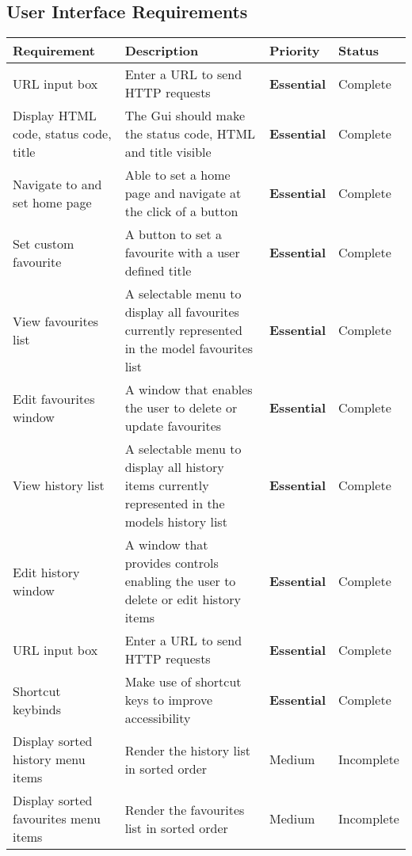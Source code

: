 \documentclass[../Main.tex]{subfiles}
\begin{document}
\subsection{User Interface Requirements}\label{subsec:UIRequirements}
\begin{center}
        \begin{longtable}{|p{3cm}|p{7cm}|l|p{2cm}|}
            \hline
            \textbf{Requirement} & \textbf{Description} & \textbf{Priority} & \textbf{Status}\\
            \hline \endhead
            URL input box & Enter a URL to send HTTP requests & \textbf{Essential} & Complete\\
            \hline
            Display HTML code, status code, title & The Gui should make the status code, HTML and title visible & \textbf{Essential} & Complete\\
            \hline
            Navigate to and set home page & Able to set a home page and navigate at the click of a button & \textbf{Essential} & Complete\\
            \hline
            Set custom favourite & A button to set a favourite with a user defined title & \textbf{Essential} & Complete\\
            \hline
            View favourites list & A selectable menu to display all favourites currently represented in the model favourites list & \textbf{Essential} & Complete\\
            \hline
            Edit favourites window & A window that enables the user to delete or update favourites & \textbf{Essential} & Complete\\
            \hline
            View history list & A selectable menu to display all history items currently represented in the models history list & \textbf{Essential} & Complete\\
            \hline
            Edit history window & A window that provides controls enabling the user to delete or edit history items & \textbf{Essential} & Complete\\
            \hline
            URL input box & Enter a URL to send HTTP requests & \textbf{Essential} & Complete\\
            \hline
            Shortcut keybinds & Make use of shortcut keys to improve accessibility & \textbf{Essential} & Complete\\
            \hline
            Display sorted history menu items & Render the history list in sorted order & Medium & Incomplete \\
            \hline
            Display sorted favourites menu items & Render the favourites list in sorted order & Medium & Incomplete \\
            \hline
        \end{longtable}
        \label{tab:UIRequirements}
\end{center}
\end{document}
